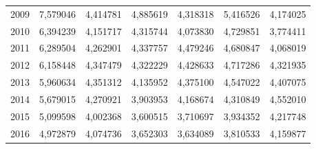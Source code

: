 \begin{table}
\begin{tabular}{p{1cm}p{2cm}p{2cm}p{2cm}p{2cm}p{2cm}p{2cm}}
 2009 &        7,579046 &                               4,414781 &                                 4,885619 &                                   4,318318 &      5,416526 &                                     4,174025 \\
 2010 &        6,394239 &                               4,151717 &                                 4,315744 &                                   4,073830 &      4,729851 &                                     3,774411 \\
 2011 &        6,289504 &                               4,262901 &                                 4,337757 &                                   4,479246 &      4,680847 &                                     4,068019 \\
 2012 &        6,158448 &                               4,347479 &                                 4,322229 &                                   4,428633 &      4,717286 &                                     4,321935 \\
 2013 &        5,960634 &                               4,351312 &                                 4,135952 &                                   4,375100 &      4,547022 &                                     4,407075 \\
 2014 &        5,679015 &                               4,270921 &                                 3,903953 &                                   4,168674 &      4,310849 &                                     4,552010 \\
 2015 &        5,099598 &                               4,002368 &                                 3,600515 &                                   3,710697 &      3,934352 &                                     4,217748 \\
 2016 &        4,972879 &                               4,074736 &                                 3,652303 &                                   3,634089 &      3,810533 &                                     4,159877 \\
\bottomrule
\end{tabular}
\end{table}
